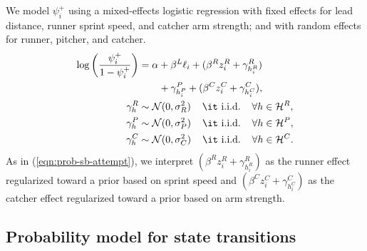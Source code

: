 \documentclass[opre,dblanonrev]{informs4}
\begin{document}
        We model $\psi_i^+$ using a mixed-effects logistic regression with fixed effects for lead distance, runner sprint speed, and catcher arm strength; and with random effects for runner, pitcher, and catcher.
        \begin{align}
          \label{eqn:prob-sb-success}
          \begin{split}
            \log\left(\frac{\psi_i^+}{1 - \psi_i^+}\right) &= \alpha + \beta^L \ell_i + (\beta^R z_i^R + \gamma^R_{h_i^R})\\
            &\qquad +\gamma^P_{h_i^P} + (\beta^C z_i^C + \gamma^C_{h_i^C}),\\
            \gamma^R_{h} &\sim \mathcal{N}(0, \sigma^2_R) \hspace{4mm} \mbox{\it i.i.d.} \hspace{4mm} \forall h \in \mathcal{H}^R,\\
            \gamma^P_{h} &\sim \mathcal{N}(0, \sigma^2_P) \hspace{4mm} \mbox{\it i.i.d.} \hspace{4mm} \forall h \in \mathcal{H}^P,\\
            \gamma^C_{h} &\sim \mathcal{N}(0, \sigma^2_C) \hspace{4mm} \mbox{\it i.i.d.} \hspace{4mm} \forall h \in \mathcal{H}^C.
          \end{split}
        \end{align}
        As in (\ref{eqn:prob-sb-attempt}), we interpret $(\beta^R z_i^R + \gamma^R_{h_i^R})$ as the runner effect regularized toward a prior based on sprint speed and $(\beta^C z_i^C + \gamma^C_{h_i^C})$ as the catcher effect regularized toward a prior based on arm strength.

    \subsection{Probability model for state transitions}
    \label{sec:prob-state-transition}
\end{document}

